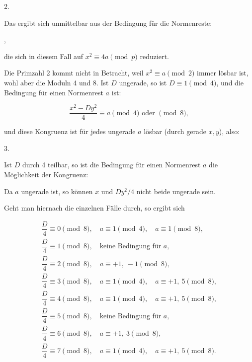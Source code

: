 2. 

Das ergibt sich unmittelbar aus der Bedingung für die Normenreste:

,

die sich in diesem Fall auf $x^2 \equiv 4a \pmod{p}$ reduziert.

Die Primzahl 2 kommt nicht in Betracht, weil $x^2 \equiv a \pmod{2}$ immer lösbar ist, wohl aber die Moduln 4 und 8. Ist $D$ ungerade, so ist $D \equiv 1 \pmod{4}$, und die Bedingung für einen Normenrest $a$ ist:

\[ \frac{x^2 - D y^2}{4} \equiv a \pmod{4} \text{ oder } \pmod{8}, \]

und diese Kongruenz ist für jedes ungerade $a$ lösbar (durch gerade $x, y$), also:

3. 

Ist $D$ durch 4 teilbar, so ist die Bedingung für einen Normenrest $a$ die Möglichkeit der Kongruenz:


Da $a$ ungerade ist, so können $x$ und $D y^2/4$ nicht beide ungerade sein.

Geht man hiernach die einzelnen Fälle durch, so ergibt sich

\[
\begin{array}{l}
\dfrac{D}{4} \equiv 0 \pmod{8}, \quad a \equiv 1 \pmod{4}, \quad a \equiv 1 \pmod{8},\\[6pt]
\dfrac{D}{4} \equiv 1 \pmod{8}, \quad \text{keine Bedingung für } a,\\[6pt]
\dfrac{D}{4} \equiv 2 \pmod{8}, \quad a \equiv +1,\ -1 \pmod{8},\\[6pt]
\dfrac{D}{4} \equiv 3 \pmod{8}, \quad a \equiv 1 \pmod{4}, \quad a \equiv +1,\ 5 \pmod{8},\\[6pt]
\dfrac{D}{4} \equiv 4 \pmod{8}, \quad a \equiv 1 \pmod{4}, \quad a \equiv +1,\ 5 \pmod{8},\\[6pt]
\dfrac{D}{4} \equiv 5 \pmod{8}, \quad \text{keine Bedingung für } a,\\[6pt]
\dfrac{D}{4} \equiv 6 \pmod{8}, \quad a \equiv +1,\ 3 \pmod{8},\\[6pt]
\dfrac{D}{4} \equiv 7 \pmod{8}, \quad a \equiv 1 \pmod{4}, \quad a \equiv +1,\ 5 \pmod{8}.
\end{array}
\]

